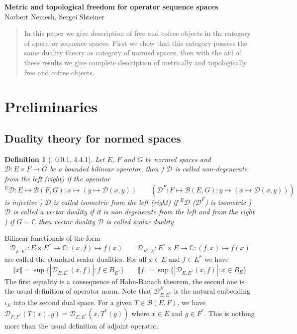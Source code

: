 \documentclass[12pt]{article}
\newtheorem{definition}[theorem]{Definition}
\begin{document}
\begin{center}

\Large \textbf{Metric and topological freedom for operator sequence spaces}\\[0.5cm]
\small {Norbert Nemesh, Sergei Shteiner}\\[0.5cm]

\end{center}
\thispagestyle{empty}

\begin{abstract} 
In this paper we give description of free and cofree objects in the  category of operator sequence spaces. First we show that this category possess the same duality theory as category of normed spaces, then with the aid of these results we give complete description of metrically and topologically free and cofree objects.
\end{abstract}

\section{Preliminaries}

\subsection{Duality theory for normed spaces}
\begin{definition}[\cite{HelQFA}, 0.0.1, 4.4.1]\label{DefDuality} Let $E$, $F$ and $G$ be normed spaces and $\mathcal{D}:E\times F\to G$ be a bounded bilinear operator, then 
) $\mathcal{D}$ is called non-degenerate from the left (right) if the operator 
$$
{}^E\mathcal{D}:E\mapsto\mathcal{B}(F,G):x\mapsto(y\mapsto\mathcal{D}(x,y))\qquad
(\mathcal{D}^F:F\mapsto\mathcal{B}(E,G):y\mapsto(x\mapsto\mathcal{D}(x,y)))
$$ 
is injective
) $\mathcal{D}$ is called isometric from the left (right) if ${}^E\mathcal{D}$ ($\mathcal{D}^F$) is isometric 
) $\mathcal{D}$ is called a vector duality if it is non degenerate from the left and from the right
) if $G=\mathbb{C}$ then vector duality $\mathcal{D}$ is called scalar duality 
\end{definition}
Bilinear functionals of the form
$$
\mathcal{D}_{E,E^*}:E\times E^*\to\mathbb{C}:(x,f)\mapsto f(x)
\qquad
\mathcal{D}_{E^*,E}:E^*\times E\to\mathbb{C}:(f,x)\mapsto f(x)
$$
are called the standard scalar dualities. For all $x\in E$ and $f\in E^*$ we have
$$
\Vert x\Vert=\sup\{|\mathcal{D}_{E,E^*}(x,f)|:f\in B_{E^*}\}
\qquad
\Vert f\Vert=\sup\{|\mathcal{D}_{E,E^*}(x,f)|:x\in  B_E\} 
$$
The first equality is a consequence of Hahn-Banach theorem, the second one is the usual definition of operator norm. Note that $\mathcal{D}_{E,E^*}^E$ is the natural embedding $\iota_E$ into the second dual space. For a given $T\in \mathcal{B}(E,F)$, we have $\mathcal{D}_{F,F^*}(T(x),g)=\mathcal{D}_{E,E^*}(x,T^*(g))$
where $x\in E$ and $g\in F^*$. This is nothing more than the usual definition of adjoint operator.
\end{document}
